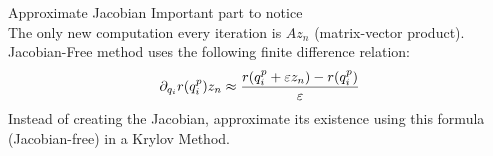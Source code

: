 \documentclass[10pt,t,xcolor=table,compress]{UWMadBeamer}
\begin{document}
        
        \begin{frame}{Approximate Jacobian}
        Important part to notice
            \begin{equation}
                [A\,z_1,A\,z_2,...,A\,z_n]
            \end{equation}
        The only new computation every iteration is $A z_n$ (matrix-vector product).
        \vfill
        Jacobian-Free method uses the following finite difference relation:
        \begin{equation}
            \partial_{\qi} r(\qi^{p}) z_n \approx \frac{r(\qi^{p} + \varepsilon z_n) - r(\qi^{p})}{\varepsilon}
        \end{equation}
        \vfill
        Instead of creating the Jacobian, approximate its existence using this formula (Jacobian-free) in a Krylov Method.
        \end{frame}
\end{document}
